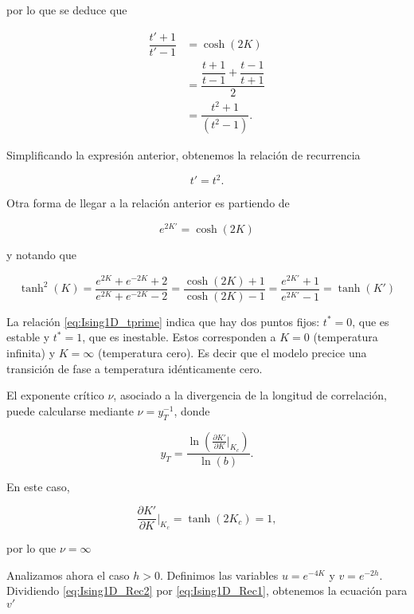 \documentclass[10pt]{article}
\begin{document}
por lo que se deduce que 

\begin{align}
 \dfrac{t'+1}{t'-1}  &= \cosh(2K) \nonumber \\
 &= \dfrac{\dfrac{t+1}{t-1} + \dfrac{t-1}{t+1}}{2} \nonumber \\
 &= \dfrac{t^2+1}{(t^2-1)}.
\end{align}

Simplificando la expresi\'on anterior, obtenemos la relaci\'on de recurrencia

\begin{equation} \label{eq:Ising1D_tprime}
t' = t^2.
\end{equation}

Otra forma de llegar a la relaci\'on anterior es partiendo de 

\begin{equation}
e^{2K'} = \cosh(2K)
\end{equation}

y notando que 

\begin{equation}
\tanh^2(K) = \dfrac{e^{2K} + e^{-2K} + 2}{e^{2K} + e^{-2K} - 2} = \dfrac{\cosh(2K) + 1}{\cosh(2K) - 1}= \dfrac{e^{2K'} + 1}{e^{2K'} - 1} = \tanh(K') 
\end{equation}

La relaci\'on \ref{eq:Ising1D_tprime} indica que hay dos puntos fijos: $t^*=0$, que es estable y $t^*=1$, que es inestable. Estos corresponden a $K=0$ (temperatura infinita) y $K=\infty$ (temperatura cero). Es decir que el modelo precice una transici\'on de fase a temperatura id\'enticamente cero.

El exponente cr\'itico $\nu$, asociado a la divergencia de la longitud de correlaci\'on, puede calcularse mediante $\nu = y_T^{-1}$, donde 

\begin{equation}
y_T = \dfrac{\ln\left(\frac{\partial K'}{\partial K}\Bigr|_{K_c}\right)}{\ln (b)}.
\end{equation}

En este caso,

\begin{equation}
\frac{\partial K'}{\partial K}\Bigr|_{K_c} = \tanh(2K_c) = 1,
\end{equation}

por lo que $\nu = \infty$

Analizamos ahora el caso $h>0$. Definimos las variables $u=e^{-4K}$ y $v=e^{-2h}$. Dividiendo  \ref{eq:Ising1D_Rec2} por  \ref{eq:Ising1D_Rec1}, obtenemos la ecuaci\'on para $v'$
\end{document}
